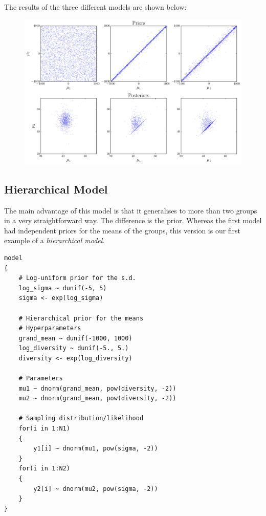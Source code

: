 The results of the three different models are shown below:
\begin{figure}
\begin{center}
\includegraphics[scale=0.6]{Figures/ttest.pdf}
\end{center}
\end{figure}


\subsection{Hierarchical Model}
The main advantage of this model is that it generalises to more than two groups
in a very straightforward way. The difference is the prior. Whereas the first
model had independent priors for the means of the groups, this version is our
first example of a {\it hierarchical model}.
\begin{framed}
\begin{verbatim}
model
{
    # Log-uniform prior for the s.d.
    log_sigma ~ dunif(-5, 5)
    sigma <- exp(log_sigma)

    # Hierarchical prior for the means
    # Hyperparameters
    grand_mean ~ dunif(-1000, 1000)
    log_diversity ~ dunif(-5., 5.)
    diversity <- exp(log_diversity)

    # Parameters
    mu1 ~ dnorm(grand_mean, pow(diversity, -2))
    mu2 ~ dnorm(grand_mean, pow(diversity, -2))

    # Sampling distribution/likelihood
    for(i in 1:N1)
    {
        y1[i] ~ dnorm(mu1, pow(sigma, -2))
    }
    for(i in 1:N2)
    {
        y2[i] ~ dnorm(mu2, pow(sigma, -2))
    }
}

\end{verbatim}
\end{framed}



